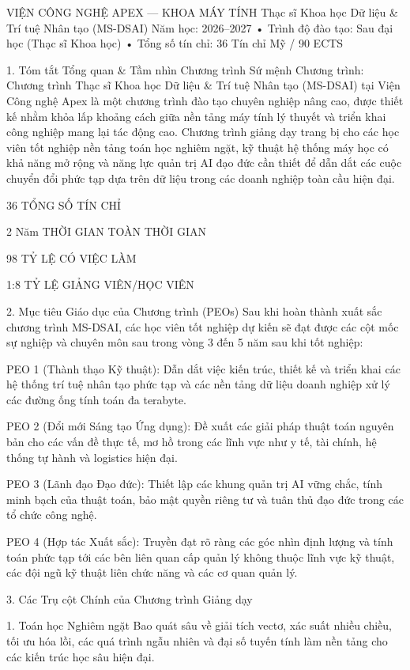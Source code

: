 \documentclass[12pt]{article}
\begin{document}
VIỆN CÔNG NGHỆ APEX — KHOA MÁY TÍNH
Thạc sĩ Khoa học Dữ liệu & Trí tuệ Nhân tạo (MS-DSAI)
Năm học: 2026–2027
• Trình độ đào tạo: Sau đại học (Thạc sĩ Khoa học)
• Tổng số tín chỉ: 36 Tín chỉ Mỹ / 90 ECTS

1. Tóm tắt Tổng quan & Tầm nhìn Chương trình
Sứ mệnh Chương trình: Chương trình Thạc sĩ Khoa học Dữ liệu & Trí tuệ Nhân tạo (MS-DSAI) tại Viện Công nghệ Apex là một chương trình đào tạo chuyên nghiệp nâng cao, được thiết kế nhằm khỏa lấp khoảng cách giữa nền tảng máy tính lý thuyết và triển khai công nghiệp mang lại tác động cao. Chương trình giảng dạy trang bị cho các học viên tốt nghiệp nền tảng toán học nghiêm ngặt, kỹ thuật hệ thống máy học có khả năng mở rộng và năng lực quản trị AI đạo đức cần thiết để dẫn dắt các cuộc chuyển đổi phức tạp dựa trên dữ liệu trong các doanh nghiệp toàn cầu hiện đại.

36
TỔNG SỐ TÍN CHỈ

2 Năm
THỜI GIAN TOÀN THỜI GIAN

98%
TỶ LỆ CÓ VIỆC LÀM

1:8
TỶ LỆ GIẢNG VIÊN/HỌC VIÊN

2. Mục tiêu Giáo dục của Chương trình (PEOs)
Sau khi hoàn thành xuất sắc chương trình MS-DSAI, các học viên tốt nghiệp dự kiến sẽ đạt được các cột mốc sự nghiệp và chuyên môn sau trong vòng 3 đến 5 năm sau khi tốt nghiệp:

PEO 1 (Thành thạo Kỹ thuật): Dẫn dắt việc kiến trúc, thiết kế và triển khai các hệ thống trí tuệ nhân tạo phức tạp và các nền tảng dữ liệu doanh nghiệp xử lý các đường ống tính toán đa terabyte.

PEO 2 (Đổi mới Sáng tạo Ứng dụng): Đề xuất các giải pháp thuật toán nguyên bản cho các vấn đề thực tế, mơ hồ trong các lĩnh vực như y tế, tài chính, hệ thống tự hành và logistics hiện đại.

PEO 3 (Lãnh đạo Đạo đức): Thiết lập các khung quản trị AI vững chắc, tính minh bạch của thuật toán, bảo mật quyền riêng tư và tuân thủ đạo đức trong các tổ chức công nghệ.

PEO 4 (Hợp tác Xuất sắc): Truyền đạt rõ ràng các góc nhìn định lượng và tính toán phức tạp tới các bên liên quan cấp quản lý không thuộc lĩnh vực kỹ thuật, các đội ngũ kỹ thuật liên chức năng và các cơ quan quản lý.

3. Các Trụ cột Chính của Chương trình Giảng dạy

1. Toán học Nghiêm ngặt
Bao quát sâu về giải tích vectơ, xác suất nhiều chiều, tối ưu hóa lồi, các quá trình ngẫu nhiên và đại số tuyến tính làm nền tảng cho các kiến trúc học sâu hiện đại.
\end{document}
